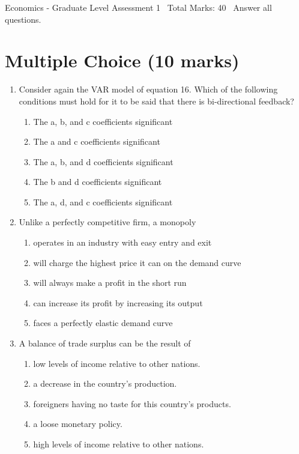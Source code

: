 \documentclass[12pt]{article}
\begin{document}
\begin{center}
Economics - Graduate Level Assessment 1 \
Total Marks: 40 \
Answer all questions.
\end{center}

\section*{Multiple Choice (10 marks)}
\begin{enumerate}[label=\arabic*.]
\item Consider again the VAR model of equation 16. Which of the following conditions must hold for it to be said that there is bi-directional feedback?
\begin{enumerate}[label=(\alph*)]
    \item The a, b, and c coefficients significant
    \item The a and c coefficients significant
    \item The a, b, and d coefficients significant
    \item The b and d coefficients significant
    \item The a, d, and c coefficients significant
\end{enumerate}
\item Unlike a perfectly competitive firm, a monopoly
\begin{enumerate}[label=(\alph*)]
    \item operates in an industry with easy entry and exit
    \item will charge the highest price it can on the demand curve
    \item will always make a profit in the short run
    \item can increase its profit by increasing its output
    \item faces a perfectly elastic demand curve
\end{enumerate}
\item A balance of trade surplus can be the result of
\begin{enumerate}[label=(\alph*)]
    \item low levels of income relative to other nations.
    \item a decrease in the country's production.
    \item foreigners having no taste for this country's products.
    \item a loose monetary policy.
    \item high levels of income relative to other nations.

\end{enumerate}
\end{enumerate}
\end{document}
